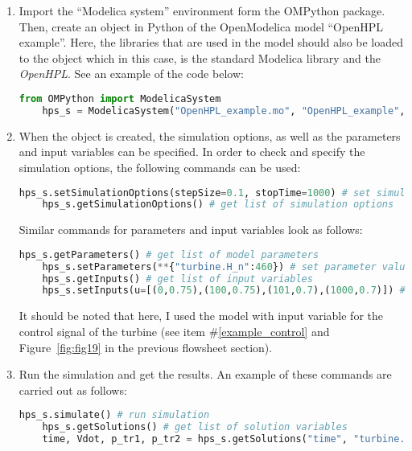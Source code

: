 \documentclass[%
]{USN-PhD}
\begin{document}
\begin{enumerate}
    \item Import the ``Modelica system'' environment form the OMPython package. Then, create an object in Python of the OpenModelica model ``OpenHPL example''. Here, the libraries that are used in the model should also be loaded to the object which in this case, is the standard Modelica library and the \emph{OpenHPL}. See an example of the code below:
    \begin{lstlisting}[language = Python]
    from OMPython import ModelicaSystem
    hps_s = ModelicaSystem("OpenHPL_example.mo", "OpenHPL_example", ["Modelica", "OpenHPL/package.mo"])
    \end{lstlisting}
    \item When the object is created, the simulation options, as well as the parameters and input variables can be specified. In order to check and specify the simulation options, the following commands can be used:
    \begin{lstlisting}[language = Python]
    hps_s.setSimulationOptions(stepSize=0.1, stopTime=1000) # set simulation options
    hps_s.getSimulationOptions() # get list of simulation options
    \end{lstlisting}
    Similar commands for parameters and input variables look as follows:
    \begin{lstlisting}[language = Python]
    hps_s.getParameters() # get list of model parameters
    hps_s.setParameters(**{"turbine.H_n":460}) # set parameter value for the turbine nominal head
    hps_s.getInputs() # get list of input variables
    hps_s.setInputs(u=[(0,0.75),(100,0.75),(101,0.7),(1000,0.7)]) # set input value over time as a ramp signal
    \end{lstlisting}
    It should be noted that here, I used the model with input variable for the control signal of the turbine (see item \#\ref{example_control} and Figure~\ref{fig:fig19} in the previous flowsheet section).
    \item Run the simulation and get the results. An example of these commands are carried out as follows:
    \begin{lstlisting}[language = Python]
    hps_s.simulate() # run simulation
    hps_s.getSolutions() # get list of solution variables
    time, Vdot, p_tr1, p_tr2 = hps_s.getSolutions("time", "turbine.Vdot", "turbine.p_tr1", "turbine.p_tr2") # get results of simulation time variable, and the turbine flow rate, inlet and outlet pressures.
    \end{lstlisting}

\end{enumerate}
\end{document}
